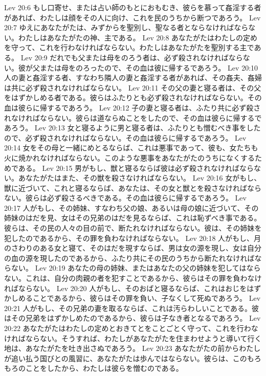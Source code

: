 Lev 20:6  もし口寄せ、または占い師のもとにおもむき、彼らを慕って姦淫する者があれば、わたしは顔をその人に向け、これを民のうちから断つであろう。
Lev 20:7  ゆえにあなたがたは、みずからを聖別し、聖なる者とならなければならない。わたしはあなたがたの神、主である。
Lev 20:8  あなたがたはわたしの定めを守って、これを行わなければならない。わたしはあなたがたを聖別する主である。
Lev 20:9  だれでも父または母をのろう者は、必ず殺されなければならない。彼が父または母をのろったので、その血は彼に帰するであろう。
Lev 20:10  人の妻と姦淫する者、すなわち隣人の妻と姦淫する者があれば、その姦夫、姦婦は共に必ず殺されなければならない。
Lev 20:11  その父の妻と寝る者は、その父をはずかしめる者である。彼らはふたりとも必ず殺されなければならない。その血は彼らに帰するであろう。
Lev 20:12  子の妻と寝る者は、ふたり共に必ず殺されなければならない。彼らは道ならぬことをしたので、その血は彼らに帰するであろう。
Lev 20:13  女と寝るように男と寝る者は、ふたりとも憎むべき事をしたので、必ず殺されなければならない。その血は彼らに帰するであろう。
Lev 20:14  女をその母と一緒にめとるならば、これは悪事であって、彼も、女たちも火に焼かれなければならない。このような悪事をあなたがたのうちになくするためである。
Lev 20:15  男がもし、獣と寝るならば彼は必ず殺されなければならない。あなたがたはまた、その獣を殺さなければならない。
Lev 20:16  女がもし、獣に近づいて、これと寝るならば、あなたは、その女と獣とを殺さなければならない。彼らは必ず殺さるべきである。その血は彼らに帰するであろう。
Lev 20:17  人がもし、その姉妹、すなわち父の娘、あるいは母の娘に近づいて、その姉妹のはだを見、女はその兄弟のはだを見るならば、これは恥ずべき事である。彼らは、その民の人々の目の前で、断たれなければならない。彼は、その姉妹を犯したのであるから、その罪を負わなければならない。
Lev 20:18  人がもし、月のさわりのある女と寝て、そのはだを現すならば、男は女の源を現し、女は自分の血の源を現したのであるから、ふたり共にその民のうちから断たれなければならない。
Lev 20:19  あなたの母の姉妹、またはあなたの父の姉妹を犯してはならない。これは、自分の肉親の者を犯すことであるから、彼らはその罪を負わなければならない。
Lev 20:20  人がもし、そのおばと寝るならば、これはおじをはずかしめることであるから、彼らはその罪を負い、子なくして死ぬであろう。
Lev 20:21  人がもし、その兄弟の妻を取るならば、これは汚らわしいことである。彼はその兄弟をはずかしめたのであるから、彼らは子なき者となるであろう。
Lev 20:22  あなたがたはわたしの定めとおきてとをことごとく守って、これを行わなければならない。そうすれば、わたしがあなたがたを住まわせようと導いて行く地は、あなたがたを吐き出さぬであろう。
Lev 20:23  あなたがたの前からわたしが追い払う国びとの風習に、あなたがたは歩んではならない。彼らは、このもろもろのことをしたから、わたしは彼らを憎むのである。
